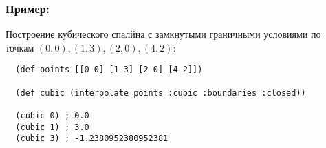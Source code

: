 \subsubsection{Пример:}

Построение кубического спалйна с замкнутыми граничными условиями по точкам $(0, 0), (1, 3), (2, 0), (4, 2)$:

\begin{verbatim}
  (def points [[0 0] [1 3] [2 0] [4 2]])

  (def cubic (interpolate points :cubic :boundaries :closed))

  (cubic 0) ; 0.0
  (cubic 1) ; 3.0
  (cubic 3) ; -1.2380952380952381
\end{verbatim}


